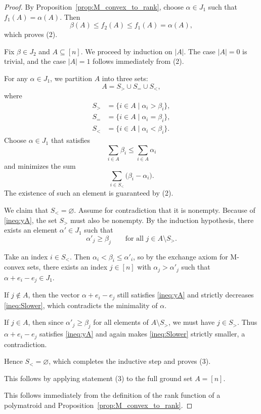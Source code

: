 \documentclass[10pt,a4paper]{amsart}
\begin{document}
\begin{proof}
\medskip
{}
By Proposition~\ref{prop:M_convex_to_rank}, choose $\alpha\in J_1$ such
that $f_1(A)=\alpha(A)$. Then
\[
    \beta(A)\leq f_2(A)\leq f_1(A)=\alpha(A),
\]
which proves (2).

\medskip
{}
Fix $\beta \in J_2$ and $A \subseteq [n]$. We proceed by induction on
$|A|$. The case $|A| = 0$ is trivial, and the case $|A|=1$ follows immediately from (2).

For any $\alpha \in J_1$, we partition $A$ into three sets:
\[
    A = S_> \cup S_= \cup S_<,
\]
where
\begin{align*}
    S_> &= \{i \in A \mid \alpha_i > \beta_i\}, \\
    S_= &= \{i \in A \mid \alpha_i = \beta_i\}, \\
    S_< &= \{i \in A \mid \alpha_i < \beta_i\}.
\end{align*}
Choose $\alpha \in J_1$ that satisfies
\begin{equation*}\label{ineq:yA}
    \sum_{i \in A} \beta_i \leq \sum_{i \in A} \alpha_i \tag{$\star$}
\end{equation*}
and minimizes the sum
\begin{equation*}\label{ineq:Slower}
    \sum_{i \in S_<} \bigl(\beta_i-\alpha_i\bigr). \tag{$\star\star$}
\end{equation*}
The existence of such an element is guaranteed by (2).

We claim that $S_< = \varnothing$. Assume for contradiction that it is
nonempty. Because of \eqref{ineq:yA}, the set $S_>$ must also be nonempty.
By the induction hypothesis, there exists an element $\alpha' \in J_1$ such
that
\[
    \alpha'_j \geq \beta_j
    \qquad\text{for all }j\in A\setminus S_>.
\]

Take an index $i \in S_<$. Then
$\alpha_i<\beta_i\leq\alpha'_i$, so by the exchange axiom for M-convex
sets, there exists an index $j\in[n]$ with
$\alpha_j>\alpha'_j$ such that
$\alpha+e_i-e_j\in J_1$.

If $j\notin A$, then the vector $\alpha+e_i-e_j$ still satisfies
\eqref{ineq:yA} and strictly decreases \eqref{ineq:Slower}, which
contradicts the minimality of $\alpha$.

If $j\in A$, then since $\alpha'_j\geq\beta_j$ for all elements of
$A\setminus S_>$, we must have $j\in S_>$. Thus
$\alpha+e_i-e_j$ satisfies \eqref{ineq:yA} and again makes
\eqref{ineq:Slower} strictly smaller, a contradiction.

Hence $S_<=\varnothing$, which completes the inductive step and proves
(3).

\medskip
{}
This follows by applying statement (3) to the full ground set $A=[n]$.

\medskip
{}
This follows immediately from the definition of the rank function of a
polymatroid and Proposition~\ref{prop:M_convex_to_rank}.
\end{proof}
\end{document}
